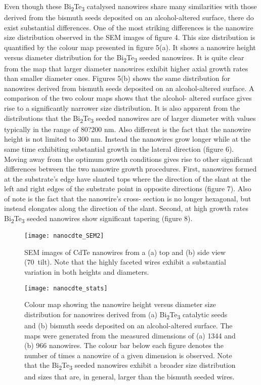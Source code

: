 Even though these Bi\textsubscript{2}Te\textsubscript{3} catalysed nanowires share
many similarities with those derived from the bismuth seeds
deposited on an alcohol-altered surface, there do exist
substantial differences. One of the most striking differences
is the nanowire size distribution observed in the SEM images
of figure 4. This size distribution is quantified by the colour
map presented in figure 5(a). It shows a nanowire height
versus diameter distribution for the Bi\textsubscript{2}Te\textsubscript{3} seeded nanowires. It is quite clear from the map that larger diameter nanowires exhibit higher axial growth rates than smaller diameter ones. Figures 5(b) shows the same distribution for nanowires derived 
from bismuth seeds deposited on an alcohol-altered surface. A 
comparison of the two colour maps shows that the alcohol- 
altered surface gives rise to a significantly narrower size 
distribution. It is also apparent from the distributions that the 
Bi\textsubscript{2}Te\textsubscript{3} seeded nanowires are of larger diameter with values typically in the range of 80?200 nm. Also different is the fact that the nanowire height is not limited to 300 nm. Instead the nanowires grow longer while at the same time exhibiting
substantial growth in the lateral direction (figure 6).
Moving away from the optimum growth conditions gives
rise to other significant differences between the two nanowire
growth procedures. First, nanowires formed at the substrate's
edge have slanted tops where the direction of the slant at the
left and right edges of the substrate point in opposite directions
(figure 7). Also of note is the fact that the nanowire's cross-
section is no longer hexagonal, but instead elongates along the
direction of the slant. Second, at high growth rates Bi\textsubscript{2}Te\textsubscript{3}
seeded nanowires show significant tapering (figure 8).
\begin{figure}
    \centering
    \texttt{[image: nanocdte\_SEM2]}
    \caption{\label{fig:nanocdte_SEM2}SEM images of CdTe nanowires from a (a) top and (b) side view (70\degree~tilt). Note that the highly faceted wires exhibit a substantial variation in both heights and diameters.}
\end{figure}
\begin{figure}
    \centering
    \texttt{[image: nanocdte\_stats]}
    \caption{\label{fig:nanocdte_stats}Colour map showing the nanowire height versus diameter size distribution for nanowires derived from (a) Bi\textsubscript{2}Te\textsubscript{3} catalytic seeds
        and (b) bismuth seeds deposited on an alcohol-altered surface. The maps were generated from the measured dimensions of (a) 1344 and
        (b) 966 nanowires. The colour bar below each figure denotes the number of times a nanowire of a given dimension is observed. Note that the
        Bi\textsubscript{2}Te\textsubscript{3} seeded nanowires exhibit a broader size distribution and sizes that are, in general, larger than the bismuth seeded wires.}
\end{figure}
